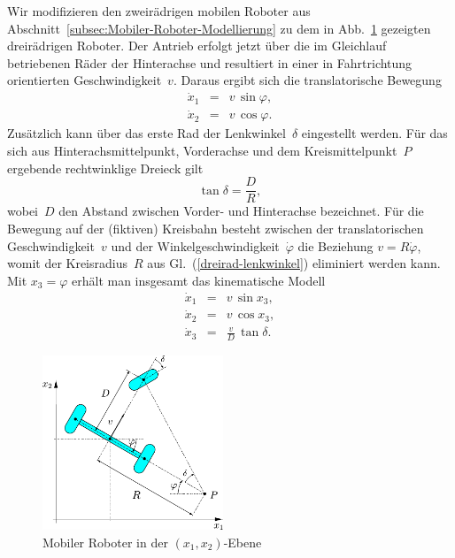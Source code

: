 \begin{example}
\label{exa:Dreirad-Modell-EZ-SISO}Wir modifizieren den zweirädrigen
mobilen Roboter aus Abschnitt~\ref{subsec:Mobiler-Roboter-Modellierung}
zu dem in Abb.~\ref{fig:dreirad} gezeigten dreirädrigen Roboter.
Der Antrieb erfolgt jetzt über die im Gleichlauf betriebenen Räder
der Hinterachse und resultiert in einer in Fahrtrichtung orientierten
Geschwindigkeit~$v$. Daraus ergibt sich die translatorische Bewegung
\begin{equation}
\begin{array}{lcl}
\dot{x}_{1} & = & v\,\sin\varphi,\\
\dot{x}_{2} & = & v\,\cos\varphi.
\end{array}\label{eq:dreirad-modell-trans}
\end{equation}
Zusätzlich kann über das erste Rad der Lenkwinkel~$\delta$ eingestellt
werden. Für das sich aus Hinterachsmittelpunkt, Vorderachse und dem
Kreismittelpunkt~$P$ ergebende rechtwinklige Dreieck gilt 
\begin{equation}
\tan\delta=\frac{D}{R},\label{dreirad-lenkwinkel}
\end{equation}
wobei~$D$ den Abstand zwischen Vorder- und Hinterachse bezeichnet.
Für die Bewegung auf der (fiktiven) Kreisbahn besteht zwischen der
translatorischen Geschwindigkeit~$v$ und der Winkelgeschwindigkeit~$\dot{\varphi}$
die Beziehung $v=R\dot{\varphi}$, womit der Kreisradius~$R$ aus
Gl.~(\ref{dreirad-lenkwinkel}) eliminiert werden kann. Mit $x_{3}=\varphi$
erhält man insgesamt das kinematische Modell
\begin{equation}
\begin{array}{lcl}
\dot{x}_{1} & = & v\,\sin x_{3},\\
\dot{x}_{2} & = & v\,\cos x_{3},\\
\dot{x}_{3} & = & \frac{v}{D}\,\tan\delta.
\end{array}\label{eq:dreirad-kinematisches-modell}
\end{equation}

\begin{figure}
\begin{centering}
\includegraphics[width=0.48\textwidth]{Roboter_drei_Raeder}
\par\end{centering}
\caption{Mobiler Roboter in der $(x_{1},x_{2})$-Ebene\label{fig:dreirad}}
\end{figure}


\end{example}
